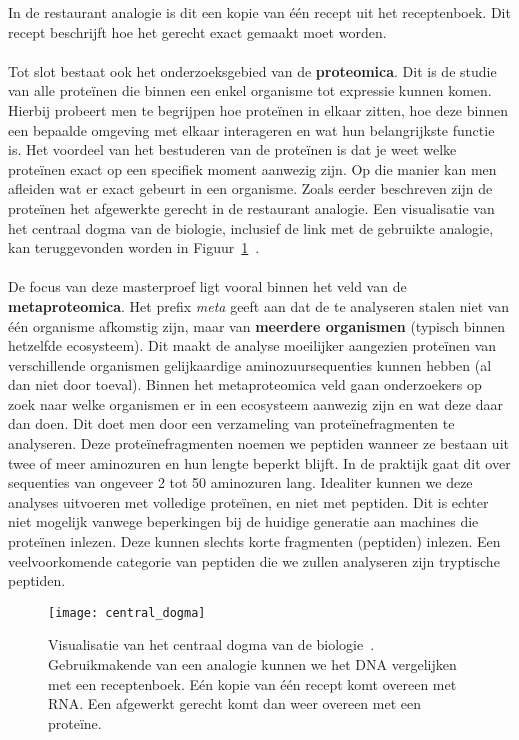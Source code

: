 In de restaurant analogie is dit een kopie van één recept uit het receptenboek.
Dit recept beschrijft hoe het gerecht exact gemaakt moet worden.
\\ \\
Tot slot bestaat ook het onderzoeksgebied van de \textbf{proteomica}.
Dit is de studie van alle proteïnen die binnen een enkel organisme tot expressie kunnen komen.
Hierbij probeert men te begrijpen hoe proteïnen in elkaar zitten, hoe deze binnen een bepaalde omgeving met elkaar interageren en wat hun belangrijkste functie is.
Het voordeel van het bestuderen van de proteïnen is dat je weet welke proteïnen exact op een specifiek moment aanwezig zijn.
Op die manier kan men afleiden wat er exact gebeurt in een organisme.
Zoals eerder beschreven zijn de proteïnen het afgewerkte gerecht in de restaurant analogie.
Een visualisatie van het centraal dogma van de biologie, inclusief de link met de gebruikte analogie, kan teruggevonden worden in Figuur~\ref{fig:recipe}~\cite{image_central_dogma}.
\\ \\
De focus van deze masterproef ligt vooral binnen het veld van de \textbf{metaproteomica}.
Het prefix \textit{meta} geeft aan dat de te analyseren stalen niet van één organisme afkomstig zijn, maar van \textbf{meerdere organismen} (typisch binnen hetzelfde ecosysteem).
Dit maakt de analyse moeilijker aangezien proteïnen van verschillende organismen gelijkaardige aminozuursequenties kunnen hebben (al dan niet door toeval).
Binnen het metaproteomica veld gaan onderzoekers op zoek naar welke organismen er in een ecosysteem aanwezig zijn en wat deze daar dan doen.
Dit doet men door een verzameling van proteïnefragmenten te analyseren.
Deze proteïnefragmenten noemen we peptiden wanneer ze bestaan uit twee of meer aminozuren en hun lengte beperkt blijft.
In de praktijk gaat dit over sequenties van ongeveer 2 tot 50 aminozuren lang.
Idealiter kunnen we deze analyses uitvoeren met volledige proteïnen, en niet met peptiden.
Dit is echter niet mogelijk vanwege beperkingen bij de huidige generatie aan machines die proteïnen inlezen.
Deze kunnen slechts korte fragmenten (peptiden) inlezen.
Een veelvoorkomende categorie van peptiden die we zullen analyseren zijn tryptische peptiden.

\begin{figure}[H]
    \centering
    \texttt{[image: central\_dogma]}
    \caption{Visualisatie van het centraal dogma van de biologie~\cite{image_central_dogma}. Gebruikmakende van een analogie kunnen we het DNA vergelijken met een receptenboek. Eén kopie van één recept komt overeen met RNA. Een afgewerkt gerecht komt dan weer overeen met een proteïne.}
    \label{fig:recipe}
\end{figure}


